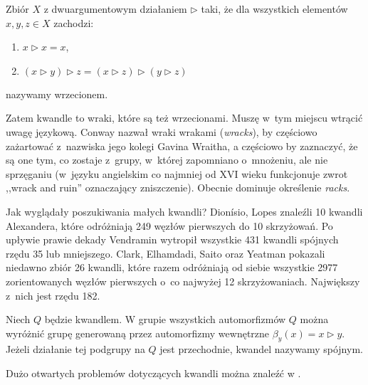\begin{definition}[wrzeciono]
%
    Zbiór $X$ z dwuargumentowym działaniem $\triangleright$ taki, że dla wszystkich elementów $x, y, z \in X$ zachodzi:
    \begin{enumerate}
        \item $x \triangleright x = x$,
        \item $(x \triangleright y) \triangleright z = (x \triangleright z) \triangleright (y \triangleright z)$
    \end{enumerate}
    nazywamy wrzecionem.
\end{definition}

Zatem kwandle to wraki, które są też wrzecionami.
Muszę w~tym miejscu wtrącić uwagę językową.
Conway nazwał wraki wrakami (\emph{wracks}), by częściowo zażartować z~nazwiska jego kolegi Gavina Wraitha, a częściowo by zaznaczyć, że są one tym, co zostaje z~grupy, w~której zapomniano o~mnożeniu, ale nie sprzęganiu (w~języku angielskim co najmniej od XVI wieku funkcjonuje zwrot ,,wrack and ruin'' oznaczający zniszczenie).
%
%
Obecnie dominuje określenie \emph{racks}.

Jak wyglądały poszukiwania małych kwandli?
Dionísio, Lopes \cite{lopes03} znaleźli 10 kwandli Alexandera, które odróżniają 249 węzłów pierwszych do 10 skrzyżowań.
%
%
Po upływie prawie dekady Vendramin \cite{vendramin12} wytropił wszystkie 431 kwandli spójnych rzędu 35 lub mniejszego.
%
Clark, Elhamdadi, Saito oraz Yeatman \cite{clark13} pokazali niedawno zbiór 26 kwandli, które razem odróżniają od siebie wszystkie 2977 zorientowanych węzłów pierwszych o~co najwyżej 12 skrzyżowaniach.
%
%
%
%
Największy z~nich jest rzędu 182.

\begin{definition}
%
    Niech $Q$ będzie kwandlem.
    W grupie wszystkich automorfizmów $Q$ można wyróżnić grupę generowaną przez automorfizmy wewnętrzne $\beta_y(x) = x \triangleright y$.
    Jeżeli działanie tej podgrupy na $Q$ jest przechodnie, kwandel nazywamy spójnym.
\end{definition}

Dużo otwartych problemów dotyczących kwandli można znaleźć w \cite[s. 455-465]{ohtsuki02}.



